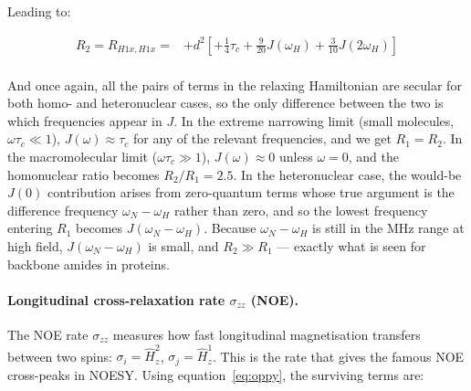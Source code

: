 \documentclass[notitlepage,11pt]{article}
\begin{document}
Leading to:

\begin{small}
\begin{equation}\begin{array}{rl}
R_2=R_{H1x,H1x}=
& + d^2 \left[ +\frac{1}{4} \tau_c +\frac{9}{20} J\left(\omega_H\right) +\frac{3}{10} J\left(2\omega_H\right)\right]\\
\end{array}\end{equation}
\end{small}




And once again, all the pairs of terms in the relaxing Hamiltonian are secular for both homo- and heteronuclear cases, so the only difference between the two is which frequencies appear in $J$. In the extreme narrowing limit (small molecules, $\omega\tau_c\ll 1$), $J(\omega)\approx\tau_c$ for any of the relevant frequencies, and we get $R_1=R_2$. In the macromolecular limit ($\omega\tau_c\gg 1$), $J(\omega)\approx 0$ unless $\omega=0$, and the homonuclear ratio becomes $R_2/R_1=2.5$. In the heteronuclear case, the would-be $J(0)$ contribution arises from zero-quantum terms whose true argument is the difference frequency $\omega_N-\omega_H$ rather than zero, and so the lowest frequency entering $R_1$ becomes $J(\omega_N-\omega_H)$. Because $\omega_N-\omega_H$ is still in the MHz range at high field, $J(\omega_N-\omega_H)$ is small, and $R_2\gg R_1$ — exactly what is seen for backbone amides in proteins.

\paragraph{Longitudinal cross-relaxation rate $\sigma_{zz}$ (NOE).} The NOE rate $\sigma_{zz}$ measures how fast longitudinal magnetisation transfers between two spins: $\sigma_i=\hat{H}^2_z$, $\sigma_j=\hat{H}^1_z$. This is the rate that gives the famous NOE cross-peaks in NOESY. Using equation~\ref{eq:oppy}, the surviving terms are:
\end{document}

